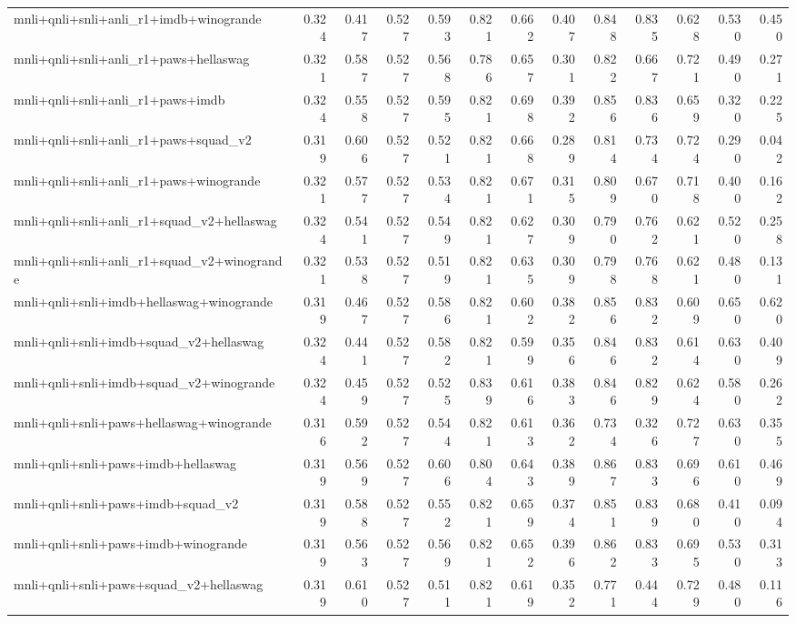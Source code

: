 \begin{table}[t]
\begin{tabular}{lrrrrrrrrrrrr}
    mnli+qnli+snli+anli\_r1+imdb+winogrande & 0.324 & 0.417 & 0.527 & 0.593 & 0.821 & 0.662 & 0.407 & 0.848 & 0.835 & 0.628 & 0.530 & 0.450 \\
    mnli+qnli+snli+anli\_r1+paws+hellaswag & 0.321 & 0.587 & 0.527 & 0.568 & 0.786 & 0.657 & 0.301 & 0.822 & 0.667 & 0.721 & 0.490 & 0.271 \\
    mnli+qnli+snli+anli\_r1+paws+imdb & 0.324 & 0.558 & 0.527 & 0.595 & 0.821 & 0.698 & 0.392 & 0.856 & 0.836 & 0.659 & 0.320 & 0.225 \\
    mnli+qnli+snli+anli\_r1+paws+squad\_v2 & 0.319 & 0.606 & 0.527 & 0.521 & 0.821 & 0.668 & 0.289 & 0.814 & 0.734 & 0.724 & 0.290 & 0.042 \\
    mnli+qnli+snli+anli\_r1+paws+winogrande & 0.321 & 0.577 & 0.527 & 0.534 & 0.821 & 0.671 & 0.315 & 0.809 & 0.670 & 0.718 & 0.400 & 0.162 \\
    mnli+qnli+snli+anli\_r1+squad\_v2+hellaswag & 0.324 & 0.541 & 0.527 & 0.549 & 0.821 & 0.627 & 0.309 & 0.790 & 0.762 & 0.621 & 0.520 & 0.258 \\
    mnli+qnli+snli+anli\_r1+squad\_v2+winogrande & 0.321 & 0.538 & 0.527 & 0.519 & 0.821 & 0.635 & 0.309 & 0.798 & 0.768 & 0.621 & 0.480 & 0.131 \\
    mnli+qnli+snli+imdb+hellaswag+winogrande & 0.319 & 0.467 & 0.527 & 0.586 & 0.821 & 0.602 & 0.382 & 0.856 & 0.832 & 0.609 & 0.650 & 0.620 \\
    mnli+qnli+snli+imdb+squad\_v2+hellaswag & 0.324 & 0.441 & 0.527 & 0.582 & 0.821 & 0.599 & 0.356 & 0.846 & 0.832 & 0.614 & 0.630 & 0.409 \\
    mnli+qnli+snli+imdb+squad\_v2+winogrande & 0.324 & 0.459 & 0.527 & 0.525 & 0.839 & 0.616 & 0.383 & 0.846 & 0.829 & 0.624 & 0.580 & 0.262 \\
    mnli+qnli+snli+paws+hellaswag+winogrande & 0.316 & 0.592 & 0.527 & 0.544 & 0.821 & 0.613 & 0.362 & 0.734 & 0.326 & 0.727 & 0.630 & 0.355 \\
    mnli+qnli+snli+paws+imdb+hellaswag & 0.319 & 0.569 & 0.527 & 0.606 & 0.804 & 0.643 & 0.389 & 0.867 & 0.833 & 0.696 & 0.610 & 0.469 \\
    mnli+qnli+snli+paws+imdb+squad\_v2 & 0.319 & 0.588 & 0.527 & 0.552 & 0.821 & 0.659 & 0.374 & 0.851 & 0.839 & 0.680 & 0.410 & 0.094 \\
    mnli+qnli+snli+paws+imdb+winogrande & 0.319 & 0.563 & 0.527 & 0.569 & 0.821 & 0.652 & 0.396 & 0.862 & 0.833 & 0.695 & 0.530 & 0.313 \\
    mnli+qnli+snli+paws+squad\_v2+hellaswag & 0.319 & 0.610 & 0.527 & 0.511 & 0.821 & 0.619 & 0.352 & 0.771 & 0.444 & 0.729 & 0.480 & 0.116 \\

\end{tabular}
\end{table}
